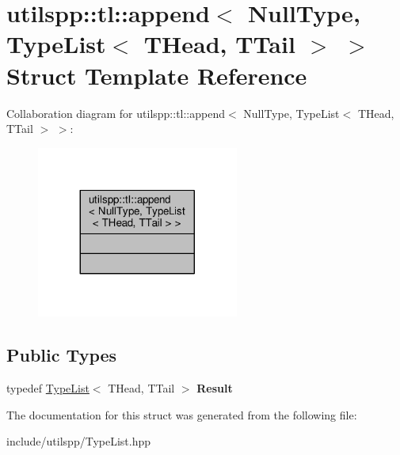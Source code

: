 \hypertarget{structutilspp_1_1tl_1_1append_3_01NullType_00_01TypeList_3_01THead_00_01TTail_01_4_01_4}{\section{utilspp\-:\-:tl\-:\-:append$<$ Null\-Type, Type\-List$<$ T\-Head, T\-Tail $>$ $>$ Struct Template Reference}
\label{structutilspp_1_1tl_1_1append_3_01NullType_00_01TypeList_3_01THead_00_01TTail_01_4_01_4}
}


Collaboration diagram for utilspp\-:\-:tl\-:\-:append$<$ Null\-Type, Type\-List$<$ T\-Head, T\-Tail $>$ $>$\-:\nopagebreak
\begin{figure}[H]
\begin{center}
\leavevmode
\includegraphics[width=188pt]{structutilspp_1_1tl_1_1append_3_01NullType_00_01TypeList_3_01THead_00_01TTail_01_4_01_4__coll__graph}
\end{center}
\end{figure}
\subsection*{Public Types}
\begin{DoxyCompactItemize}
\item 
\hypertarget{structutilspp_1_1tl_1_1append_3_01NullType_00_01TypeList_3_01THead_00_01TTail_01_4_01_4_a7e2cb7669f70b95cea96a76575ca934c}{typedef \hyperlink{structutilspp_1_1tl_1_1TypeList}{Type\-List}$<$ T\-Head, T\-Tail $>$ {\bfseries Result}}\label{structutilspp_1_1tl_1_1append_3_01NullType_00_01TypeList_3_01THead_00_01TTail_01_4_01_4_a7e2cb7669f70b95cea96a76575ca934c}

\end{DoxyCompactItemize}


The documentation for this struct was generated from the following file\-:\begin{DoxyCompactItemize}
\item 
include/utilspp/Type\-List.\-hpp\end{DoxyCompactItemize}
